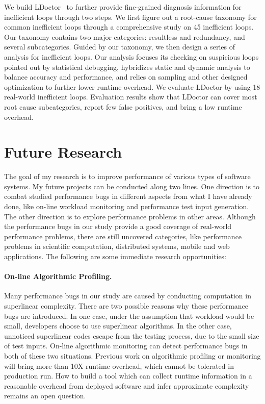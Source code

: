 \documentclass[10pt]{article}
\begin{document}
We build LDoctor~\cite{Song16PLDI} to further provide fine-grained diagnosis information for inefficient loops through two steps. 
We first figure out a root-cause taxonomy for common inefficient loops through a comprehensive study on 45 inefficient loops. 
Our taxonomy contains two major categories: resultless and redundancy, and several subcategories. 
Guided by our taxonomy, we then design a series of analysis for inefficient loops. 
Our analysis 
focuses its checking on suspicious loops pointed out by statistical debugging, 
hybridizes static and dynamic analysis to balance accuracy and performance, 
and relies on sampling and other designed optimization to further lower runtime overhead. 
We evaluate LDoctor by using 18 real-world inefficient loops. 
Evaluation results show that LDoctor can cover most root cause subcategories, 
report few false positives, and bring a low runtime overhead. 



\section{Future Research}

The goal of my research is to improve performance of various types of software systems. 
My future projects can be conducted along two lines. 
One direction is to combat studied performance bugs in different aspects from what I have already done, 
like on-line workload monitoring and performance test input generation. 
The other direction is to explore performance problems in other areas. 
Although the performance bugs in our study provide a good coverage of real-world performance problems, 
there are still uncovered categories, 
like performance problems in scientific computation, distributed systems, mobile and web applications. 
The following are some immediate research opportunities: 

\paragraph{On-line Algorithmic Profiling.}
Many performance bugs in our study are caused by conducting computation in superlinear complexity. 
There are two possible reasons why these performance bugs are introduced. 
In one case, under the assumption that workload would be small, developers choose to use superlinear algorithms. 
In the other case, unnoticed superlinear codes escape from the testing process, due to the small size of test inputs. 
On-line algorithmic monitoring can detect performance bugs in both of these two situations. 
Previous work on algorithmic profiling or monitoring will bring more than 10X runtime overhead, 
which cannot be tolerated in production run. 
How to build a tool which can collect runtime information in a reasonable overhead from deployed software 
and infer approximate complexity remains an open question. 
\end{document}
